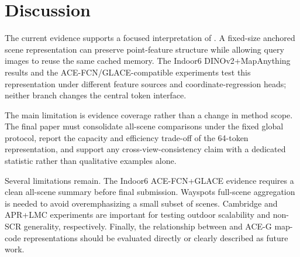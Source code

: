 \section{Discussion}

The current evidence supports a focused interpretation of \method{}. A fixed-size anchored scene representation can preserve point-feature structure while allowing query images to reuse the same cached memory. The Indoor6 DINOv2+MapAnything results and the ACE-FCN/GLACE-compatible experiments test this representation under different feature sources and coordinate-regression heads; neither branch changes the central token interface.

The main limitation is evidence coverage rather than a change in method scope. The final paper must consolidate all-scene comparisons under the fixed global protocol, report the capacity and efficiency trade-off of the 64-token representation, and support any cross-view-consistency claim with a dedicated statistic rather than qualitative examples alone.

Several limitations remain. The Indoor6 ACE-FCN+GLACE evidence requires a clean all-scene summary before final submission. Wayspots full-scene aggregation is needed to avoid overemphasizing a small subset of scenes. Cambridge and APR+LMC experiments are important for testing outdoor scalability and non-SCR generality, respectively. Finally, the relationship between \method{} and ACE-G map-code representations should be evaluated directly or clearly described as future work.
